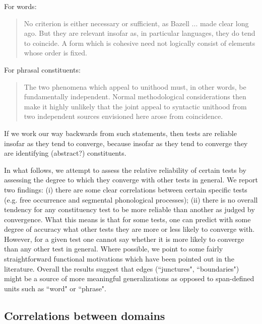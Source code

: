 \documentclass[output=paper,draftmode]{langscibook}
\begin{document}
For words:
\begin{quote}
    No criterion is either necessary or sufficient, as Bazell ... made clear long ago. But they are relevant insofar as, in particular languages, they do tend to coincide. A form which is cohesive need not logically consist of elements whose order is fixed. \citep[276]{matthews:words}
\end{quote}

For phrasal constituents:
\begin{quote}
    The two phenomena which appeal to unithood must, in other words, be fundamentally independent. Normal methodological considerations then make it highly unlikely that the joint appeal to syntactic unithood from two independent sources envisioned here arose from coincidence. \citep[13]{levine2017syntactic}
\end{quote}

If we work our way backwards from such statements, then tests are reliable insofar as they tend to converge, because insofar as they tend to converge they are identifying (abstract?) constituents.

In what follows, we attempt to assess the relative reliability of certain tests by assessing the degree to which they converge with other tests in general. We report two findings: (i) there are some clear correlations between certain specific tests (e.g. free occurrence and segmental phonological processes); (ii) there is no overall tendency for any constituency test to be more reliable than another as judged by convergence. What this means is that for some tests, one can predict with some degree of accuracy what other tests they are more or less likely to converge with. However, for a given test one cannot say whether it is more likely to converge than any other test in general. Where possible, we point to some fairly straightforward functional motivations which have been pointed out in the literature. Overall the results suggest that edges (``junctures", ``boundaries") might be a source of more meaningful generalizations as opposed to span-defined units such as ``word" or ``phrase".

\subsection{Correlations between domains}
\end{document}
